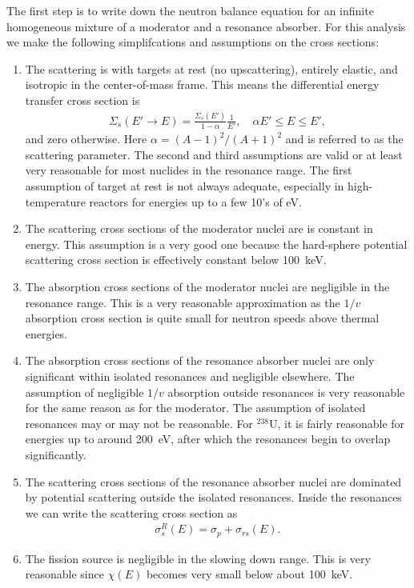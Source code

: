 The first step is to write down the neutron balance equation for an infinite homogeneous mixture of a moderator and a resonance absorber. For this analysis we make the following simplifcations and assumptions on the cross sections:
\begin{enumerate}
  \item The scattering is with targets at rest (no upscattering), entirely elastic, and isotropic in the center-of-mass frame. This means the differential energy transfer cross section is
  \begin{align}
    \Sigma_s( E' \rightarrow E ) = \frac{\Sigma_s(E')}{ 1 - \alpha } \frac{1}{E'}, \quad \alpha E' \le E \le E',
  \end{align}
  and zero otherwise. Here $\alpha = (A-1)^2/(A+1)^2$ and is referred to as the scattering parameter. The second and third assumptions are valid or at least very reasonable for most nuclides in the resonance range. The first assumption of target at rest is not always adequate, especially in high-temperature reactors for energies up to a few 10's of eV. 
  \item The scattering cross sections of the moderator nuclei are is constant in energy. This assumption is a very good one because the hard-sphere potential scattering cross section is effectively constant below 100~keV.
  \item The absorption cross sections of the moderator nuclei are negligible in the resonance range. This is a very reasonable approximation as the $1/v$ absorption cross section is quite small for neutron speeds above thermal energies.
  \item The absorption cross sections of the resonance absorber nuclei are only significant within isolated resonances and negligible elsewhere. The assumption of negligible $1/v$ absorption outside resonances is very reasonable for the same reason as for the moderator. The assumption of isolated resonances may or may not be reasonable. For $^{238}$U, it is fairly reasonable for energies up to around 200~eV, after which the resonances begin to overlap significantly.
  \item The scattering cross sections of the resonance absorber nuclei are dominated by potential scattering outside the isolated resonances. Inside the resonances we can write the scattering cross section as
  \begin{align}
    \sigma_s^R(E) = \sigma_p + \sigma_{rs}(E) .
  \end{align}
  \item The fission source is negligible in the slowing down range. This is very reasonable since $\chi(E)$ becomes very small below about 100~keV.
\end{enumerate}
